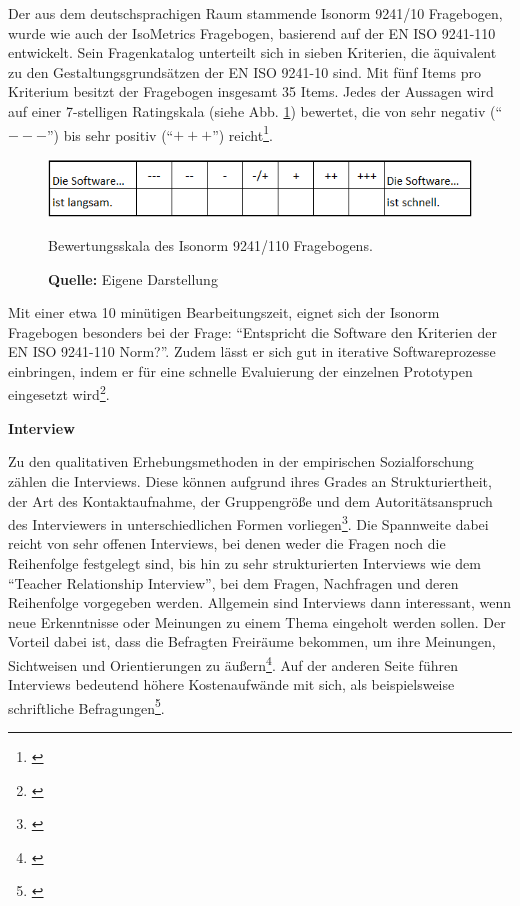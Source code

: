 Der aus dem deutschsprachigen Raum stammende Isonorm 9241/10 Fragebogen, wurde wie auch der IsoMetrics Fragebogen, basierend auf der EN ISO 9241-110 entwickelt. Sein Fragenkatalog unterteilt sich in sieben Kriterien, die äquivalent zu den Gestaltungsgrundsätzen der EN ISO 9241-10 sind. Mit fünf Items pro Kriterium besitzt der Fragebogen insgesamt 35 Items. Jedes der Aussagen wird auf einer 7-stelligen Ratingskala (siehe Abb. \ref{fig:IsonormBewertungsskala}) bewertet, die von sehr negativ (\enquote{$---$}) bis sehr positiv (\enquote{$+++$}) reicht\footnote{\cite[vgl.][Kap. 3.3]{Figl2010}}. 
\begin{figure}[H]
  \centering
  \includegraphics[scale=0.95]{img/Isonorm_Bewertungsskala.PNG}
  \caption{Bewertungsskala des Isonorm 9241/110 Fragebogens.}
  \caption*{\textbf{Quelle:} Eigene Darstellung}
  \label{fig:IsonormBewertungsskala}
\end{figure}
Mit einer etwa 10 minütigen Bearbeitungszeit, eignet sich der Isonorm Fragebogen besonders bei der Frage: \enquote{Entspricht die Software den Kriterien der EN ISO 9241-110 Norm?}. Zudem lässt er sich gut in iterative Softwareprozesse einbringen, indem er für eine schnelle Evaluierung der einzelnen Prototypen eingesetzt wird\footnote{\cite[vgl.][Kap. 3.3]{Figl2010}}.

\textbf{Interview}

Zu den qualitativen Erhebungsmethoden in der empirischen Sozialforschung zählen die Interviews. Diese können aufgrund ihres Grades an Strukturiertheit, der Art des Kontaktaufnahme, der Gruppengröße und dem Autoritätsanspruch des Interviewers in unterschiedlichen Formen vorliegen\footnote{\cite[vgl.][61]{Hegner2003}}. Die Spannweite dabei reicht von sehr offenen Interviews, bei denen weder die Fragen noch die Reihenfolge festgelegt sind, bis hin zu sehr strukturierten Interviews wie dem \enquote{Teacher Relationship Interview}, bei dem Fragen, Nachfragen und deren Reihenfolge vorgegeben werden. Allgemein sind Interviews dann interessant, wenn neue Erkenntnisse oder Meinungen zu einem Thema eingeholt werden sollen. Der Vorteil dabei ist, dass die Befragten Freiräume bekommen, um ihre Meinungen, Sichtweisen und Orientierungen zu äußern\footnote{\cite[vgl.][52\psqq]{Kelle2008}}. Auf der anderen Seite führen Interviews bedeutend höhere Kostenaufwände mit sich, als beispielsweise schriftliche Befragungen\footnote{\cite[vgl.][62\psq]{Hegner2003}}.

